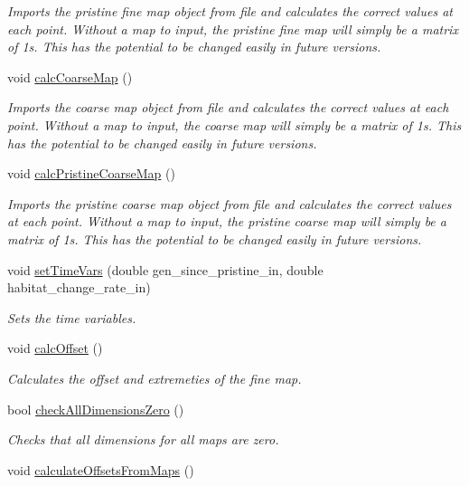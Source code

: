 \begin{DoxyCompactItemize}
\begin{DoxyCompactList}\small\item\em Imports the pristine fine map object from file and calculates the correct values at each point. Without a map to input, the pristine fine map will simply be a matrix of 1s. This has the potential to be changed easily in future versions. \end{DoxyCompactList}\item 
void \hyperlink{class_landscape_a2b34dcd828e0006dde9e60315cbddac8}{calc\+Coarse\+Map} ()\hypertarget{class_landscape_a2b34dcd828e0006dde9e60315cbddac8}{}\label{class_landscape_a2b34dcd828e0006dde9e60315cbddac8}

\begin{DoxyCompactList}\small\item\em Imports the coarse map object from file and calculates the correct values at each point. Without a map to input, the coarse map will simply be a matrix of 1s. This has the potential to be changed easily in future versions. \end{DoxyCompactList}\item 
void \hyperlink{class_landscape_a4dec3f0568fd393b197c7c42878744b0}{calc\+Pristine\+Coarse\+Map} ()\hypertarget{class_landscape_a4dec3f0568fd393b197c7c42878744b0}{}\label{class_landscape_a4dec3f0568fd393b197c7c42878744b0}

\begin{DoxyCompactList}\small\item\em Imports the pristine coarse map object from file and calculates the correct values at each point. Without a map to input, the pristine coarse map will simply be a matrix of 1s. This has the potential to be changed easily in future versions. \end{DoxyCompactList}\item 
void \hyperlink{class_landscape_aecca7c3f17087922283f63ce6148ddb4}{set\+Time\+Vars} (double gen\+\_\+since\+\_\+pristine\+\_\+in, double habitat\+\_\+change\+\_\+rate\+\_\+in)
\begin{DoxyCompactList}\small\item\em Sets the time variables. \end{DoxyCompactList}\item 
void \hyperlink{class_landscape_ae4d6050ab25b5c0dca01446b0e59bfb1}{calc\+Offset} ()
\begin{DoxyCompactList}\small\item\em Calculates the offset and extremeties of the fine map. \end{DoxyCompactList}\item 
bool \hyperlink{class_landscape_a998dcf0659841398c2eb336c91ecdfba}{check\+All\+Dimensions\+Zero} ()
\begin{DoxyCompactList}\small\item\em Checks that all dimensions for all maps are zero. \end{DoxyCompactList}\item 
void \hyperlink{class_landscape_a67fc255ef73d331034f2a626117035e8}{calculate\+Offsets\+From\+Maps} ()\hypertarget{class_landscape_a67fc255ef73d331034f2a626117035e8}{}\label{class_landscape_a67fc255ef73d331034f2a626117035e8}


\end{DoxyCompactItemize}
